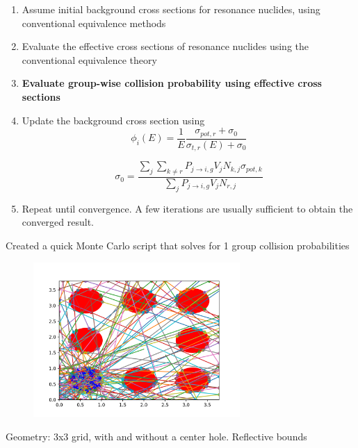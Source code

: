 \documentclass{beamer}
\begin{document}
    \begin{frame}
      \begin{enumerate}
        \item Assume initial background cross sections for resonance nuclides, using conventional equivalence methods
        \item Evaluate the effective cross sections of resonance nuclides using the conventional equivalence theory
        \item \textbf{Evaluate group-wise collision probability using effective cross sections }
        \item Update the background cross section using
\begin{equation*}\phi_i(E)=\frac{1}{E}\frac{\sigma_{pot,r}+\sigma_{0}}{\sigma_{t,r}(E)+\sigma_{0}}\end{equation*}

\begin{equation*}\sigma_{0}=\frac{\sum\limits_j\sum\limits_{k\neq r}P_{j\rightarrow i,g}V_{j}N_{k,j}\sigma_{pot,k}}{\sum\limits_jP_{j\rightarrow i,g}V_{j}N_{r,j}}\end{equation*}


        \item Repeat until convergence. A few iterations are usually sufficient to obtain the converged result.
      \end{enumerate}
\end{frame}





\begin{frame}
  Created a quick Monte Carlo script that solves for 1 group collision probabilities 
\begin{figure}
\includegraphics[width=0.7\textwidth]{collisionProb1}
\end{figure}
  Geometry: 3x3 grid, with and without a center hole. Reflective bounds



\end{frame}
\end{document}
